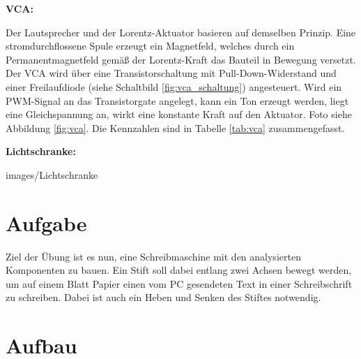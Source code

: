 \documentclass[a4paper,twoside,12pt,DIV=13,BCOR=5mm,numbers=noenddot,cleardoublepage=empty]{scrbook}
\begin{document}
\textbf{VCA:}

Der Lautsprecher und der Lorentz-Aktuator basieren auf demselben Prinzip. Eine stromdurchflossene Spule erzeugt ein Magnetfeld, welches
durch ein Permanentmagnetfeld gemäß der Lorentz-Kraft das Bauteil in Bewegung versetzt.
Der VCA wird über eine Transistorschaltung mit Pull-Down-Widerstand und einer Freilaufdiode (siehe Schaltbild \ref{fig:vca_schaltung}) angesteuert.
Wird ein PWM-Signal an das Transistorgate angelegt, kann ein Ton erzeugt werden, liegt eine Gleichspannung an, wirkt eine konstante Kraft auf den Aktuator.
Foto siehe Abbildung \ref{fig:vca}. Die Kennzahlen sind in Tabelle \ref{tab:vca} zusammengefasst.


\textbf{Lichtschranke:}

\large

{images/Lichtschranke}     %


\chapter{Aufgabe}

Ziel der Übung ist es nun, eine Schreibmaschine mit den analysierten Komponenten zu bauen.
Ein Stift soll dabei entlang zwei Achsen bewegt werden, um auf einem Blatt Papier einen vom PC gesendeten Text in einer Schreibschrift zu schreiben.
Dabei ist auch ein Heben und Senken des Stiftes notwendig.

\chapter{Aufbau}
\end{document}
